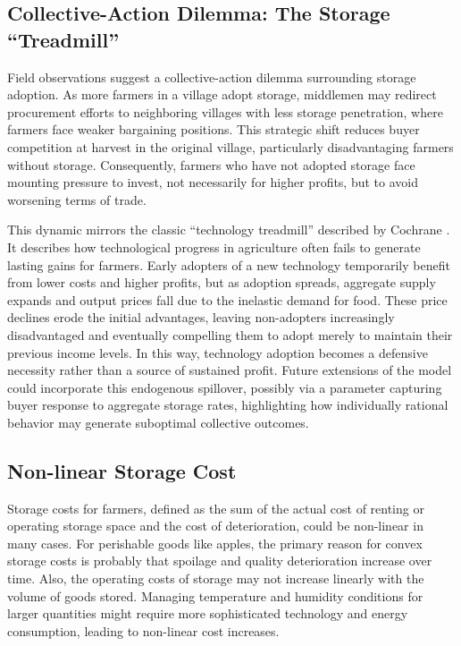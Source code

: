 \subsection{Collective-Action Dilemma: The Storage ``Treadmill''}
\noindent Field observations suggest a collective-action dilemma surrounding storage adoption. As more farmers in a village adopt storage, middlemen may redirect procurement efforts to neighboring villages with less storage penetration, where farmers face weaker bargaining positions. This strategic shift reduces buyer competition at harvest in the original village, particularly disadvantaging farmers without storage. Consequently, farmers who have not adopted storage face mounting pressure to invest, not necessarily for higher profits, but to avoid worsening terms of trade. 

This dynamic mirrors the classic ``technology treadmill'' described by Cochrane \citep{cochrane1958farm, levins1996treadmill}. It describes how technological progress in agriculture often fails to generate lasting gains for farmers. Early adopters of a new technology temporarily benefit from lower costs and higher profits, but as adoption spreads, aggregate supply expands and output prices fall due to the inelastic demand for food. These price declines erode the initial advantages, leaving non-adopters increasingly disadvantaged and eventually compelling them to adopt merely to maintain their previous income levels. In this way, technology adoption becomes a defensive necessity rather than a source of sustained profit. Future extensions of the model could incorporate this endogenous spillover, possibly via a parameter capturing buyer response to aggregate storage rates, highlighting how individually rational behavior may generate suboptimal collective outcomes.






\subsection{Non-linear Storage Cost}
\noindent Storage costs for farmers, defined as the sum of the actual cost of renting or operating storage space and the cost of deterioration, could be non-linear in many cases. For perishable goods like apples, the primary reason for convex storage costs is probably that spoilage and quality deterioration increase over time. Also, the operating costs of storage may not increase linearly with the volume of goods stored. Managing temperature and humidity conditions for larger quantities might require more sophisticated technology and energy consumption, leading to non-linear cost increases.

